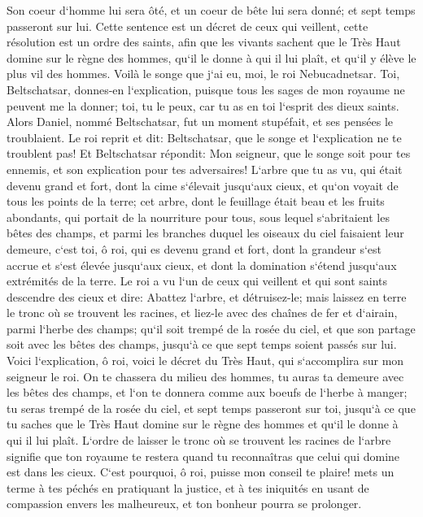 \verse Son coeur d`homme lui sera ôté, et un coeur de bête lui sera donné; et sept temps passeront sur lui. 
\verse Cette sentence est un décret de ceux qui veillent, cette résolution est un ordre des saints, afin que les vivants sachent que le Très Haut domine sur le règne des hommes, qu`il le donne à qui il lui plaît, et qu`il y élève le plus vil des hommes. 
\verse Voilà le songe que j`ai eu, moi, le roi Nebucadnetsar. Toi, Beltschatsar, donnes-en l`explication, puisque tous les sages de mon royaume ne peuvent me la donner; toi, tu le peux, car tu as en toi l`esprit des dieux saints. 
\verse Alors Daniel, nommé Beltschatsar, fut un moment stupéfait, et ses pensées le troublaient. Le roi reprit et dit: Beltschatsar, que le songe et l`explication ne te troublent pas! Et Beltschatsar répondit: Mon seigneur, que le songe soit pour tes ennemis, et son explication pour tes adversaires! 
\verse L`arbre que tu as vu, qui était devenu grand et fort, dont la cime s`élevait jusqu`aux cieux, et qu`on voyait de tous les points de la terre; 
\verse cet arbre, dont le feuillage était beau et les fruits abondants, qui portait de la nourriture pour tous, sous lequel s`abritaient les bêtes des champs, et parmi les branches duquel les oiseaux du ciel faisaient leur demeure, 
\verse c`est toi, ô roi, qui es devenu grand et fort, dont la grandeur s`est accrue et s`est élevée jusqu`aux cieux, et dont la domination s`étend jusqu`aux extrémités de la terre. 
\verse Le roi a vu l`un de ceux qui veillent et qui sont saints descendre des cieux et dire: Abattez l`arbre, et détruisez-le; mais laissez en terre le tronc où se trouvent les racines, et liez-le avec des chaînes de fer et d`airain, parmi l`herbe des champs; qu`il soit trempé de la rosée du ciel, et que son partage soit avec les bêtes des champs, jusqu`à ce que sept temps soient passés sur lui. 
\verse Voici l`explication, ô roi, voici le décret du Très Haut, qui s`accomplira sur mon seigneur le roi. 
\verse On te chassera du milieu des hommes, tu auras ta demeure avec les bêtes des champs, et l`on te donnera comme aux boeufs de l`herbe à manger; tu seras trempé de la rosée du ciel, et sept temps passeront sur toi, jusqu`à ce que tu saches que le Très Haut domine sur le règne des hommes et qu`il le donne à qui il lui plaît. 
\verse L`ordre de laisser le tronc où se trouvent les racines de l`arbre signifie que ton royaume te restera quand tu reconnaîtras que celui qui domine est dans les cieux. 
\verse C`est pourquoi, ô roi, puisse mon conseil te plaire! mets un terme à tes péchés en pratiquant la justice, et à tes iniquités en usant de compassion envers les malheureux, et ton bonheur pourra se prolonger. 
